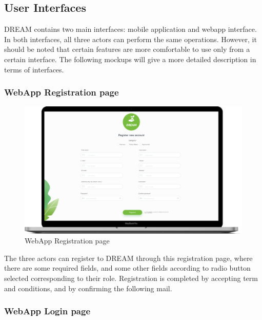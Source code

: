 \subsection{User Interfaces}
DREAM contains two main interfaces: mobile application and webapp interface.
In both interfaces, all three actors can perform the same operations.
However, it should be noted that certain features are more comfortable to use only from a certain interface.
The following mockups will give a more detailed description in terms of interfaces.


\subsubsection{WebApp Registration page}

\begin{figure}[H]
   \centering
  \centerline{\includegraphics[width=140mm,scale=0.9]{./Images//Mocks/WebApp/Registration.png}}
  \caption{WebApp Registration page}
\end{figure}

The three actors can register to DREAM through this registration page, where there are some required fields, and some other fields according to radio button selected corresponding to their role. Registration is completed by accepting term and conditions, and by confirming the following mail.

\subsubsection{WebApp Login page}

